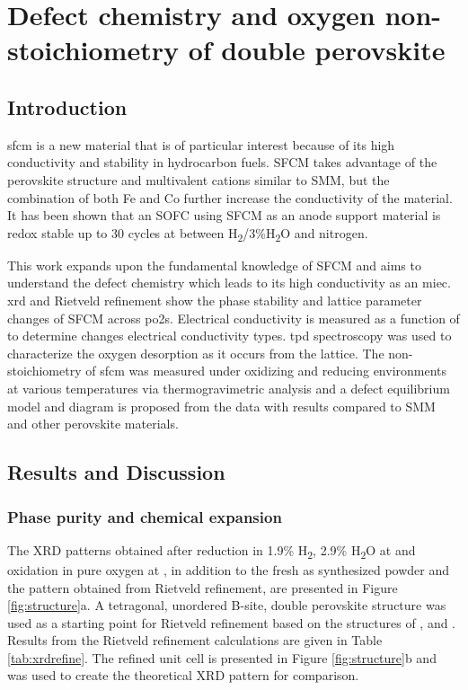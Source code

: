 
\chapter[Defect chemistry and oxygen non-stoichiometry of \ce{SrFe_{0.2}Co_{0.4}Mo_{0.4}O_{3-\delta}}]{Defect chemistry and oxygen non-stoichiometry of double perovskite }

\section{Introduction}
    \gls{sfcm} is a new material that is of particular interest because of its high conductivity and stability in hydrocarbon fuels.\cite{Pan}
    SFCM takes advantage of the perovskite structure and multivalent cations similar to SMM, but the combination of both Fe and Co further increase the conductivity of the material.
    It has been shown that an SOFC using SFCM as an anode support material is redox stable up to 30 cycles at  between H\textsubscript{2}/3\%H\textsubscript{2}O and nitrogen.\cite{Hussaina,Hussain}

    This work expands upon the fundamental knowledge of SFCM and aims to understand the defect chemistry which leads to its high conductivity as an \gls{miec}.
    \Gls{xrd} and Rietveld refinement show the phase stability and lattice parameter changes of SFCM across \glspl{po2}.
    Electrical conductivity is measured as a function of  to determine changes electrical conductivity types.
    \Gls{tpd} spectroscopy was used to characterize the oxygen desorption as it occurs from the lattice.
    The non-stoichiometry of \gls{sfcm} was measured under oxidizing and reducing environments at various temperatures via thermogravimetric analysis and a defect equilibrium model and diagram is proposed from the data with results compared to SMM and other perovskite materials.

\section{Results and Discussion}
    \subsection{Phase purity and chemical expansion}
    The XRD patterns obtained after reduction in 1.9\% H\textsubscript{2}, 2.9\% H\textsubscript{2}O at  and oxidation in pure oxygen at , in addition to the fresh as synthesized powder and the pattern obtained from Rietveld refinement, are presented in Figure \ref{fig:structure}a.
    A tetragonal, unordered B-site, double perovskite structure was used as a starting point for Rietveld refinement based on the structures of ,  and .\cite{Huang2009,Ritter2004}
    Results from the Rietveld refinement calculations are given in Table \ref{tab:xrdrefine}.
    The refined unit cell is presented in Figure \ref{fig:structure}b and was used to create the theoretical XRD pattern for comparison.

